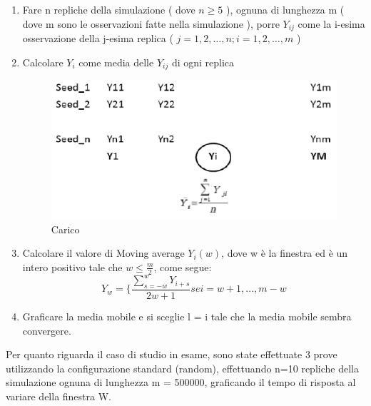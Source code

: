 \begin{enumerate}
	\item Fare n repliche della simulazione ( dove $n\geq5$ ), ognuna di lunghezza m ( dove m sono le osservazioni fatte nella simulazione ), porre $Y_{ij}$ come la i-esima osservazione della j-esima replica ( $j = 1,2,\ldots,n; i = 1,2,\ldots ,m$ )
	\item Calcolare $Y_{i}$ come media delle $Y_{ij}$ di ogni replica
\begin{figure}[H]
\begin{center}
\includegraphics[scale=0.65]{etc/ipsilon.png}
\caption{Carico}
\label{carico}
\end{center}
\end{figure}
	\item Calcolare il valore di Moving average $Y_{i}(w)$, dove w è la finestra ed è un intero positivo tale che $w \leq \frac{m}{2}$, come segue: 
$$
Y_{w} = \lbrace{ \frac{\sum_{s=-w}^{w} Y_{i+s}}{2w+1} se i=w+1, \ldots,m-w }
$$
	\item Graficare la media mobile e si sceglie l = i tale che la media mobile sembra convergere.
\end{enumerate}
Per quanto riguarda il caso di studio in esame, sono state effettuate 3 prove utilizzando la configurazione standard (random), effettuando n=10 repliche della simulazione ognuna di lunghezza
m = 500000, graficando il tempo di risposta al variare della finestra W.

